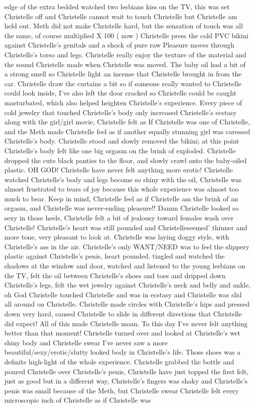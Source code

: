 \documentclass[12pt]{book}
\begin{document}
edge of the extra bedded watched two lesbians kiss on the TV, this was set Christelle off and Christelle cannot wait to touch Christelle but Christelle am held out. Meth did not make Christelle hard, but the sensation of touch was all the same, of course multiplied X 100 ( now ) Christelle press the cold PVC bikini against Christelle's genitals and a shock of pure raw Pleasure moves through Christelle's torso and legs. Christelle really enjoy the texture of the material and the sound Christelle made when Christelle was moved. The baby oil had a bit of a strong smell so Christelle light an incense that Christelle brought in from the car. Christelle draw the curtains a bit so if someone really wanted to Christelle could look inside, I've also left the door cracked so Christelle could be caught masturbated, which also helped heighten Christelle's experience. Every piece of cold jewelry that touched Christelle's body only increased Christelle's ecstasy along with the girl/girl movie, Christelle felt as If Christelle was one of Christelle, and the Meth made Christelle feel as if another equally stunning girl was caressed Christelle's body. Christelle stood and slowly removed the bikini; at this point Christelle's body felt like one big orgasm on the brink of exploded. Christelle dropped the cute black panties to the floor, and slowly crawl onto the baby-oiled plastic. OH GOD! Christelle have never felt anything more erotic! Christelle watched Christelle's body and legs become so shiny with the oil, Christelle was almost frustrated to tears of joy because this whole experience was almost too much to bear. Keep in mind, Christelle feel as if Christelle am the brink of an orgasm, and Christelle was never-ending pleasure!! Damm Christelle looked so sexy in those heels, Christelle felt a bit of jealousy toward females wash over Christelle! Christelle's heart was still pounded and Christelleseemed' thinner and more tone, very pleasant to look at. Christelle was laying doggy style, with Christelle's ass in the air. Christelle's only WANT/NEED was to feel the slippery plastic against Christelle's penis, heart pounded, tingled and watched the shadows at the window and door, watched and listened to the young lesbians on the TV, felt the oil between Christelle's shoes and toes and dripped down Christelle's legs, felt the wet jewelry against Christelle's neck and belly and ankle, oh God Christelle touched Christelle and was in ecstasy and Christelle was slid all around on Christelle. Christelle made circles with Christelle's hips and pressed down very hard, caused Christelle to slide in different directions that Christelle did expect! All of this made Christelle moan. To this day I've never felt anything better than that moment! Christelle turned over and looked at Christelle's wet shiny body and Christelle swear I've never saw a more beautiful/sexy/erotic/slutty looked body in Christelle's life. Those shoes was a definite high-light of the whole experience. Christelle grabbed the bottle and poured Christelle over Christelle's penis, Christelle have just topped the first felt, just as good but in a different way, Christelle's fingers was shaky and Christelle's penis was small because of the Meth, but Christelle swear Christelle felt every microscopic inch of Christelle as if Christelle was 
\end{document}
